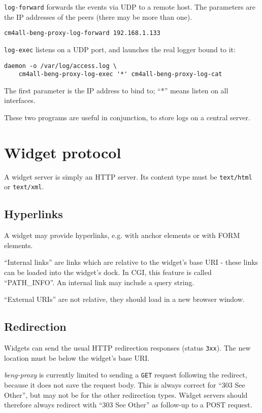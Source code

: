 \documentclass[a4paper,12pt]{article}
\begin{document}
\texttt{log-forward} forwards the events via UDP to a remote host.
The parameters are the IP addresses of the peers (there may be more
than one).

\begin{verbatim}
cm4all-beng-proxy-log-forward 192.168.1.133
\end{verbatim}

\texttt{log-exec} listens on a UDP port, and launches the real logger
bound to it:

\begin{verbatim}
daemon -o /var/log/access.log \
    cm4all-beng-proxy-log-exec '*' cm4all-beng-proxy-log-cat
\end{verbatim}

The first parameter is the IP address to bind to; ``*'' means listen
on all interfaces.

These two programs are useful in conjunction, to store logs on a
central server.


\section{Widget protocol}

A widget server is simply an HTTP server.  Its content type must be
\texttt{text/html} or \texttt{text/xml}.


\subsection{Hyperlinks}

A widget may provide hyperlinks, e.g. with anchor elements or with
FORM elements.

``Internal links'' are links which are relative to the widget's base
URI - these links can be loaded into the widget's dock.  In CGI, this
feature is called ``PATH\_INFO''.  An internal link may include a
query string.

``External URIs'' are not relative, they should
load in a new browser window.

\subsection{Redirection}

Widgets can send the usual HTTP redirection responses (status
\texttt{3xx}).  The new location must be below the widget's base URI.

\emph{beng-proxy} is currently limited to sending a \texttt{GET}
request following the redirect, because it does not save the request
body.  This is always correct for ``303 See Other'', but may not be
for the other redirection types.  Widget servers should therefore
always redirect with ``303 See Other'' as follow-up to a POST request.
\end{document}
